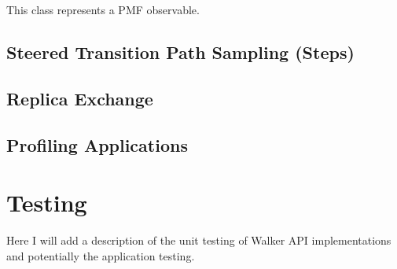 \documentclass[letterpaper,10pt,english]{sphinxmanual}
\begin{document}

\begin{fulllineitems}
\label{applications/applications.doc:observables.pmf}
This class represents a PMF observable.

\end{fulllineitems}



\section{Steered Transition Path Sampling (Steps)}
\label{applications/applications.doc:steered-transition-path-sampling-steps}

\section{Replica Exchange}
\label{applications/applications.doc:replica-exchange}

\section{Profiling Applications}
\label{applications/applications.doc:profiling-applications}

\chapter{Testing}
\label{test/testing.doc:testing}\label{test/testing.doc::doc}
Here I will add a description of the unit testing of Walker API implementations and potentially the application testing.
\end{document}

